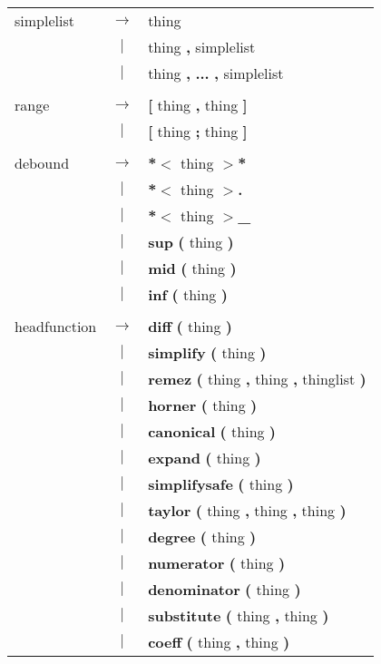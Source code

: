 \begin{tabular}{lcl}
simplelist & $\rightarrow$ & thing \\
 & $|$ & thing \textbf{,} simplelist \\
 & $|$ & thing \textbf{,} \textbf{...} \textbf{,} simplelist \\
 & & \\
range & $\rightarrow$ & \textbf{[} thing \textbf{,} thing \textbf{]} \\
 & $|$ & \textbf{[} thing \textbf{;} thing \textbf{]} \\
 & & \\
debound & $\rightarrow$ & \textbf{*$<$} thing \textbf{$>$*} \\
 & $|$ & \textbf{*$<$} thing \textbf{$>$.} \\
 & $|$ & \textbf{*$<$} thing \textbf{$>$\_} \\
 & $|$ & \textbf{sup} \textbf{(} thing \textbf{)} \\
 & $|$ & \textbf{mid} \textbf{(} thing \textbf{)} \\
 & $|$ & \textbf{inf} \textbf{(} thing \textbf{)} \\
 & & \\
headfunction & $\rightarrow$ & \textbf{diff} \textbf{(} thing \textbf{)} \\
 & $|$ & \textbf{simplify} \textbf{(} thing \textbf{)} \\
 & $|$ & \textbf{remez} \textbf{(} thing \textbf{,} thing \textbf{,} thinglist \textbf{)} \\
 & $|$ & \textbf{horner} \textbf{(} thing \textbf{)} \\
 & $|$ & \textbf{canonical} \textbf{(} thing \textbf{)} \\
 & $|$ & \textbf{expand} \textbf{(} thing \textbf{)} \\
 & $|$ & \textbf{simplifysafe} \textbf{(} thing \textbf{)} \\
 & $|$ & \textbf{taylor} \textbf{(} thing \textbf{,} thing \textbf{,} thing \textbf{)} \\
 & $|$ & \textbf{degree} \textbf{(} thing \textbf{)} \\
 & $|$ & \textbf{numerator} \textbf{(} thing \textbf{)} \\
 & $|$ & \textbf{denominator} \textbf{(} thing \textbf{)} \\
 & $|$ & \textbf{substitute} \textbf{(} thing \textbf{,} thing \textbf{)} \\
 & $|$ & \textbf{coeff} \textbf{(} thing \textbf{,} thing \textbf{)} \\

\end{tabular}
